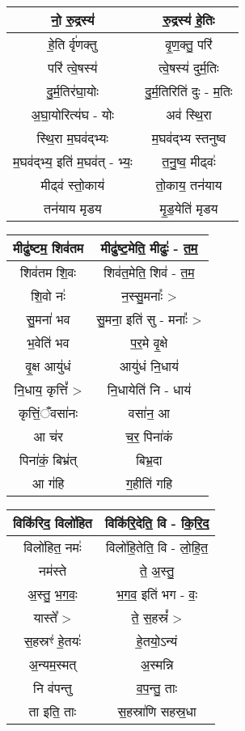 {\centering
\begin{longtable}{|c|c|}
\hline
नो॒ रु॒द्रस्य॑                     & रु॒द्रस्य॑ हे॒तिः\\
\hline
हे॒ति र्वृ॑णक्तु                    & वृ॒ण॒क्तु॒ परि॑\\
\hline
परि॑ त्वे॒षस्य॑                    & त्वे॒षस्य॑ दुर्म॒तिः\\
\hline
दु॒र्म॒तिर॑घा॒योः                  & दु॒र्म॒तिरिति॑ दुः - म॒तिः\\
\hline
अ॒घा॒योरित्य॑घ - योः             & अव॑ स्थि॒रा\\
\hline
स्थि॒रा म॒घव॑द्भ्यः                & म॒घव॑द्भ्य स्तनुष्व\\
\hline
म॒घव॑द्भ्य॒ इति॑ म॒घव॑त् - भ्यः॒        & त॒नु॒ष्व॒ मीढ्वः॑\\
\hline
मीढ्व॑ स्तो॒काय॑                  & तो॒काय॒ तन॑याय\\
\hline
तन॑याय मृडय                    & मृ॒ड॒येति॑ मृडय\\
\hline
\end{longtable}
}
{\centering
\begin{longtable}{|c|c|}
\hline
मीढु॑ष्टम॒ शिव॑तम                 & मीढु॑ष्ट॒मेति॒ मीढुः॑ - त॒म॒\\
\hline
शिव॑तम शि॒वः                   & शिव॑त॒मेति॒ शिव॑ - त॒म॒\\
\hline
शि॒वो नः॑                      & न॒स्सु॒मनाः᳚ >\\
\hline
सु॒मना॑ भव                      & सु॒मना॒ इति॑ सु - मनाः᳚ >\\
\hline
भ॒वेति॑ भव                      & प॒र॒मे वृ॒क्षे\\
\hline
वृ॒क्ष आयु॑धं                      & आयु॑धं नि॒धाय॑\\
\hline
नि॒धाय॒ कृत्तिं᳚ >                 & नि॒धायेति॑ नि - धाय॑\\
\hline
कृत्तिं॒ँवसा॑नः                    & वसा॑न॒ आ\\
\hline
आ च॑र                         & च॒र॒ पिना॑कं\\
\hline
पिना॑कं॒ बिभ्र॑त्                  & बिभ्र॒दा\\
\hline
आ ग॑हि                        & ग॒हीति॑ गहि\\
\hline
\end{longtable}
}
{\centering
\begin{longtable}{|c|c|}
\hline
विकि॑रिद॒ विलो॑हित              & विकि॑रि॒देति॒ वि - कि॒रि॒द॒\\
\hline
विलो॑हित॒ नमः॑                  & विलो॑हि॒तेति॒ वि - लो॒हि॒त॒\\
\hline
नम॑स्ते                         & ते॒ अ॒स्तु॒\\
\hline
अ॒स्तु॒ भ॒ग॒वः॒                     & भ॒ग॒व॒ इति॑ भग - वः॒\\
\hline
यास्ते᳚ >                       & ते॒ स॒हस्रं᳚ >\\
\hline
स॒हस्रꣳ॑ हे॒तयः॑                   & हे॒तयो॒ऽन्यं\\
\hline
अ॒न्यम॒स्मत्                      & अ॒स्मन्नि\\
\hline
नि व॑पन्तु                      & व॒प॒न्तु॒ ताः\\
\hline
ता इति॒ ताः                   & स॒हस्रा॑णि सहस्र॒धा\\
\hline
\end{longtable}
}
